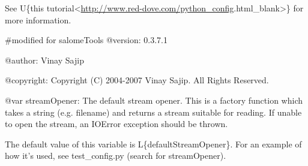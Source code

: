 \documentclass[a4paper,10pt,english]{sphinxmanual}
\begin{document}
See U\{this tutorial\textless{}\href{http://www.red-dove.com/python\_config}{http://www.red-dove.com/python\_config}.html\textbar{}\_blank\textgreater{}\} for more
information.

\#modified for salomeTools
@version: 0.3.7.1

@author: Vinay Sajip

@copyright: Copyright (C) 2004-2007 Vinay Sajip. All Rights Reserved.

@var streamOpener: The default stream opener. This is a factory function which
takes a string (e.g. filename) and returns a stream suitable for reading. If
unable to open the stream, an IOError exception should be thrown.

The default value of this variable is L\{defaultStreamOpener\}. For an example
of how it's used, see test\_config.py (search for streamOpener).
\end{document}
